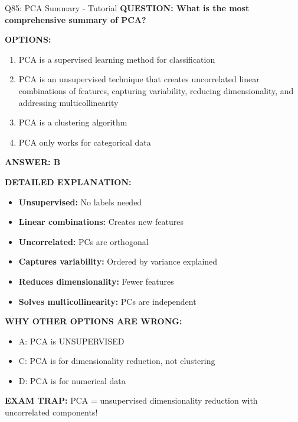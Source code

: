\documentclass[8pt]{beamer}
\begin{document}
	\begin{frame}{Q85: PCA Summary - Tutorial}
		\fontsize{6.5}{7.5}\selectfont
		\textbf{QUESTION: What is the most comprehensive summary of PCA?}
		
		\vspace{0.1cm}
		\textbf{OPTIONS:}
		\begin{enumerate}
			\item PCA is a supervised learning method for classification
			\item PCA is an unsupervised technique that creates uncorrelated linear combinations of features, capturing variability, reducing dimensionality, and addressing multicollinearity
			\item PCA is a clustering algorithm
			\item PCA only works for categorical data
		\end{enumerate}
		
		\vspace{0.1cm}
		\textcolor{myblue}{\textbf{ANSWER: B}}
		
		\vspace{0.1cm}
		\textbf{DETAILED EXPLANATION:}
		\begin{itemize}
			\item \textbf{Unsupervised:} No labels needed
			\item \textbf{Linear combinations:} Creates new features
			\item \textbf{Uncorrelated:} PCs are orthogonal
			\item \textbf{Captures variability:} Ordered by variance explained
			\item \textbf{Reduces dimensionality:} Fewer features
			\item \textbf{Solves multicollinearity:} PCs are independent
		\end{itemize}
		
		\vspace{0.1cm}
		\textcolor{myred}{\textbf{WHY OTHER OPTIONS ARE WRONG:}}
		\begin{itemize}
			\item \textcolor{myred}{A:} PCA is UNSUPERVISED
			\item \textcolor{myred}{C:} PCA is for dimensionality reduction, not clustering
			\item \textcolor{myred}{D:} PCA is for numerical data
		\end{itemize}
		
		\textcolor{myred}{\textbf{EXAM TRAP:}} PCA = \textcolor{myblue}{unsupervised dimensionality reduction with uncorrelated components}!
	\end{frame}
	
\end{document}
